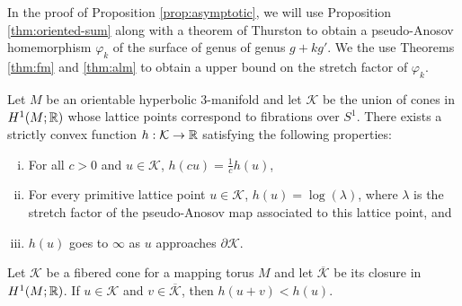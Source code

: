 In the proof of Proposition \ref{prop:asymptotic}, we will use Proposition \ref{thm:oriented-sum} along with a theorem of Thurston to obtain a pseudo-Anosov homemorphism $\varphi_k$ of the surface of genus of genus $g+kg'$.  We the use Theorems \ref{thm:fm} and \ref{thm:alm} to obtain a upper bound on the stretch factor of $\varphi_k$.


\begin{thm}
  \label{thm:fm}
  Let $M$ be an orientable hyperbolic $3$-manifold and let $\mathcal{K}$ be the union of cones in $H^1(M; \mathbb{R})$ whose lattice points correspond to fibrations over $S^1$.
  There exists a strictly convex function $h: \mathcal{K} \to \mathbb{R}$ satisfying the following properties:
  \begin{enumerate}[(i)]
  \item For all $c > 0$ and $u \in \mathcal{K}$, $h(cu) =  \frac{1}{c}h(u)$,
  \item For every primitive lattice point $u \in \mathcal{K}$, $h(u) = \log(\lambda)$, where $\lambda$ is the
    stretch factor of the pseudo-Anosov map associated to this lattice point, and
  \item $h(u)$ goes to $\infty$ as $u$ approaches $\partial \mathcal{K}$.
  \end{enumerate}
\end{thm}

\begin{thm}
  \label{thm:alm}
  Let $\mathcal{K}$ be a fibered cone for a mapping torus $M$ and let $\overline{\mathcal{K}}$ be its closure
  in $H^1(M;\mathbb{R})$. If $u \in \mathcal{K}$ and $v \in \overline{\mathcal{K}}$, then $h(u+v) < h(u)$.
\end{thm}

